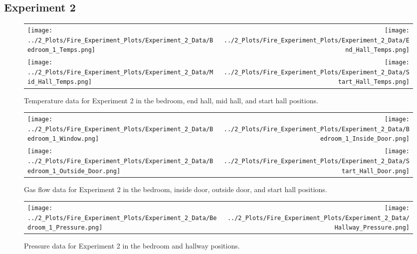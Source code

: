 \documentclass[12pt,oneside]{book}
\begin{document}
\begin{appendices}
\clearpage

\subsection*{Experiment 2}
\label{app:Experiment_2}

\begin{figure}[!ht]
\begin{tabular*}{\textwidth}{lr}
\texttt{[image: ../2\_Plots/Fire\_Experiment\_Plots/Experiment\_2\_Data/Bedroom\_1\_Temps.png]} &
\texttt{[image: ../2\_Plots/Fire\_Experiment\_Plots/Experiment\_2\_Data/End\_Hall\_Temps.png]} \\
\texttt{[image: ../2\_Plots/Fire\_Experiment\_Plots/Experiment\_2\_Data/Mid\_Hall\_Temps.png]} &
\texttt{[image: ../2\_Plots/Fire\_Experiment\_Plots/Experiment\_2\_Data/Start\_Hall\_Temps.png]} \\
\end{tabular*}
\caption[Experiment 2 Temperatures]{Temperature data for Experiment 2 in the bedroom, end hall, mid hall, and start hall positions.}
\end{figure}

\clearpage

\begin{figure}[!ht]
\begin{tabular*}{\textwidth}{lr}
\texttt{[image: ../2\_Plots/Fire\_Experiment\_Plots/Experiment\_2\_Data/Bedroom\_1\_Window.png]} &
\texttt{[image: ../2\_Plots/Fire\_Experiment\_Plots/Experiment\_2\_Data/Bedroom\_1\_Inside\_Door.png]} \\
\texttt{[image: ../2\_Plots/Fire\_Experiment\_Plots/Experiment\_2\_Data/Bedroom\_1\_Outside\_Door.png]} &
\texttt{[image: ../2\_Plots/Fire\_Experiment\_Plots/Experiment\_2\_Data/Start\_Hall\_Door.png]} \\
\end{tabular*}
\caption[Experiment 2 Gas Flows]{Gas flow data for Experiment 2 in the bedroom, inside door, outside door, and start hall positions.}
\end{figure}

\clearpage

\begin{figure}[!ht]
\begin{tabular*}{\textwidth}{lr}
\texttt{[image: ../2\_Plots/Fire\_Experiment\_Plots/Experiment\_2\_Data/Bedroom\_1\_Pressure.png]} &
\texttt{[image: ../2\_Plots/Fire\_Experiment\_Plots/Experiment\_2\_Data/Hallway\_Pressure.png]} \\
\end{tabular*}
\caption[Experiment 2 Pressures]{Pressure data for Experiment 2 in the bedroom and hallway positions.}
\end{figure}


\end{appendices}
\end{document}
